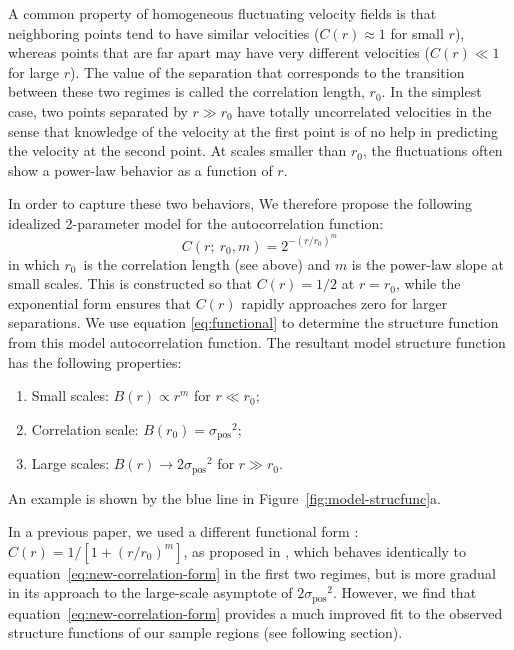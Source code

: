 \documentclass[fleqn,usenatbib, useAMS, a4paper]{mnras}
\newcommand\pos{\ensuremath{_{\mathrm{pos}}}}
\begin{document}
A common property of homogeneous fluctuating velocity fields is that neighboring points tend to have similar velocities
(\(C(r) \approx 1\) for small \(r\)),
whereas points that are far apart may have very different velocities
(\(C(r) \ll 1\) for large \(r\)).
The value of the separation that corresponds to
the transition between these two regimes
is called the correlation length, \(r_0\).
In the simplest case,
two points separated by \(r \gg r_0\) have totally uncorrelated velocities
in the sense that knowledge of the velocity at the first point is of
no help in predicting the velocity at the second point.
At scales smaller than \(r_0\), the fluctuations often show a power-law behavior
as a function of \(r\).

In order to capture these two behaviors,
We therefore propose the following idealized 2-parameter model
for the autocorrelation function:
%
\begin{equation}\label{eq:new-correlation-form}
  C(r;\ r_0, m) = 2^{- \left( r/r_0 \right)^m} 
\end{equation}
%
in which \(r_{0}\)\ is the correlation length (see above)
and \(m\) is the power-law slope at small scales.
This is constructed so that \(C(r) = 1/2\) at \(r = r_0\),
while the exponential form ensures that \(C(r)\) rapidly approaches zero
for larger separations.
We use equation \eqref{eq:functional} to determine the structure function
from this model autocorrelation function.
The resultant model structure function has the following properties:
\begin{enumerate}[1.]
 \item Small scales: \(B(r) \propto r^m\) for \(r \ll r_0\);
 \item Correlation scale: \(B(r_0) = \sigma\pos^2\);
 \item Large scales: \(B(r) \to 2 \sigma\pos^2\) for \(r \gg r_0\).
 \end{enumerate}
An example is shown by the blue line in Figure~\ref{fig:model-strucfunc}a.
 
In a previous paper, we used a different functional form
\citetext{See Fig.~13 of \citealp{arthur2016turbulence}}:
\(C(r) = 1/[1+(r/r_{0})^{m}]\), as proposed in \citet{1984ApJ...277..556S},
which behaves identically to equation~\eqref{eq:new-correlation-form}
in the first two regimes, but is more gradual in its approach
to the large-scale asymptote of \(2 \sigma\pos^2\).
However, we find that equation~\eqref{eq:new-correlation-form}
provides a much improved fit to the observed structure functions
of our sample regions (see following section). 
\end{document}
